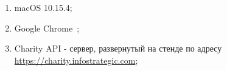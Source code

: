\begin{enumerate}
        \item macOS 10.15.4;
        \item Google Chrome~\cite{chrome};
        \item Charity API - сервер, развернутый на стенде по адресу \url{https://charity.infostrategic.com};
\end{enumerate}
